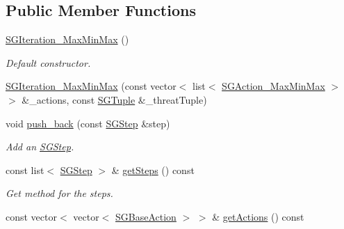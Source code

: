 \subsection*{Public Member Functions}
\begin{DoxyCompactItemize}
\item 
\mbox{\label{classSGIteration__MaxMinMax_ad1b8626f55b8bf7bc1bf5d1d248d3434}} 
\hyperlink{classSGIteration__MaxMinMax_ad1b8626f55b8bf7bc1bf5d1d248d3434}{S\+G\+Iteration\+\_\+\+Max\+Min\+Max} ()
\begin{DoxyCompactList}\small\item\em Default constructor. \end{DoxyCompactList}\item 
\hyperlink{classSGIteration__MaxMinMax_ab30ded06cb025b502da9f9b2354f9e05}{S\+G\+Iteration\+\_\+\+Max\+Min\+Max} (const vector$<$ list$<$ \hyperlink{classSGAction__MaxMinMax}{S\+G\+Action\+\_\+\+Max\+Min\+Max} $>$ $>$ \&\+\_\+actions, const \hyperlink{classSGTuple}{S\+G\+Tuple} \&\+\_\+threat\+Tuple)
\item 
\mbox{\label{classSGIteration__MaxMinMax_a09973d8b9e68b2c58c352e012750ea88}} 
void \hyperlink{classSGIteration__MaxMinMax_a09973d8b9e68b2c58c352e012750ea88}{push\+\_\+back} (const \hyperlink{classSGStep}{S\+G\+Step} \&step)
\begin{DoxyCompactList}\small\item\em Add an \hyperlink{classSGStep}{S\+G\+Step}. \end{DoxyCompactList}\item 
\mbox{\label{classSGIteration__MaxMinMax_a5183c9cf3aecf12250b657a34283e1fb}} 
const list$<$ \hyperlink{classSGStep}{S\+G\+Step} $>$ \& \hyperlink{classSGIteration__MaxMinMax_a5183c9cf3aecf12250b657a34283e1fb}{get\+Steps} () const
\begin{DoxyCompactList}\small\item\em Get method for the steps. \end{DoxyCompactList}\item 
\mbox{\label{classSGIteration__MaxMinMax_ab7935dfd6cfc657723279e1570264e28}} 
const vector$<$ vector$<$ \hyperlink{classSGBaseAction}{S\+G\+Base\+Action} $>$ $>$ \& \hyperlink{classSGIteration__MaxMinMax_ab7935dfd6cfc657723279e1570264e28}{get\+Actions} () const

\end{DoxyCompactItemize}
